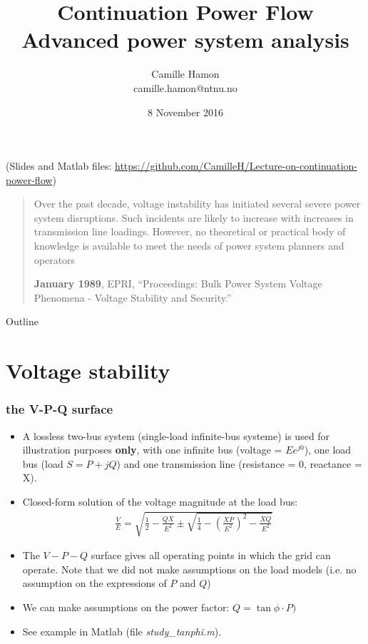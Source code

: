 \documentclass{beamer}
\title{Continuation Power Flow\\Advanced power system analysis}
\author{Camille Hamon\\camille.hamon@ntnu.no}
\date{8 November 2016}
\begin{document}
\begin{frame}[plain]
  \titlepage
{\footnotesize (Slides and Matlab files: \url{https://github.com/CamilleH/Lecture-on-continuation-power-flow})}
\end{frame}

\begin{frame}[plain]
\blockquote[\textbf{January 1989}, EPRI, “Proceedings: Bulk Power System Voltage Phenomena - Voltage Stability and Security.”]{Over the past decade, voltage instability has initiated several severe power system disruptions. Such incidents are likely to increase with increases in transmission line loadings. However, no theoretical or practical body of knowledge is available to meet the needs of power system planners and operators}  
\end{frame}

\begin{frame}{Outline}
  \tableofcontents[subsectionstyle=hide]
\end{frame}

\section[Volt. Stab.]{Voltage stability}
\begin{frame}
  \frametitle{the V-P-Q surface}
  \begin{itemize}
\item A lossless two-bus system (single-load infinite-bus systeme) is used for illustration purposes \textbf{only}, with one infinite bus (voltage = $Ee^{j0}$), one load bus (load $S = P+jQ$) and one transmission line (resistance = 0, reactance = X).
\item Closed-form solution of the voltage magnitude at the load bus:
  \begin{align*}
    \frac{V}{E} = \sqrt{\frac{1}{2}-\frac{QX}{E^2} \pm \sqrt{\frac{1}{4}-\left( \frac{XP}{E^2} \right)^2 - \frac{XQ}{E^2}}}
  \end{align*}
\item The $V-P-Q$ surface gives all operating points in which the grid can operate. Note that we did not make assumptions on the load models (i.e. no assumption on the expressions of $P$ and $Q$) 
\item We can make assumptions on the power factor: $Q=\tan \phi \cdot P)$
\item See example in Matlab (file \emph{study\_tanphi.m}).
  \end{itemize}
\end{frame}
\end{document}
